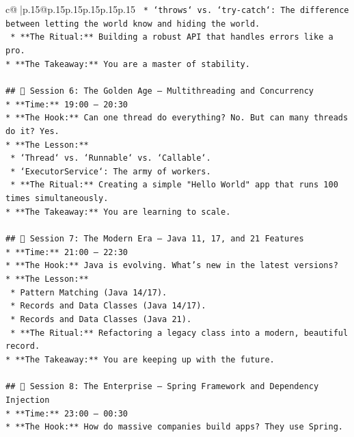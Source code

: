 \documentclass{article}
\begin{document}
{\begin{supertabular}{c@{$\;$}|p{.15\linewidth}@{}p{.15\linewidth}p{.15\linewidth}p{.15\linewidth}p{.15\linewidth}p{.15\linewidth}}
{{{\texttt{    *   `throws` vs. `try{-}catch`: The difference between letting the world know and hiding the world.} \\
\texttt{    *   **The Ritual:** Building a robust API that handles errors like a pro.} \\
\texttt{*   **The Takeaway:** You are a master of stability.} \\
\\ 
\texttt{\#\# 📅 Session 6: The Golden Age – Multithreading and Concurrency} \\
\texttt{*   **Time:** 19:00 – 20:30} \\
\texttt{*   **The Hook:** Can one thread do everything? No. But can many threads do it? Yes.} \\
\texttt{*   **The Lesson:**} \\
\texttt{    *   `Thread` vs. `Runnable` vs. `Callable`.} \\
\texttt{    *   `ExecutorService`: The army of workers.} \\
\texttt{    *   **The Ritual:** Creating a simple "Hello World" app that runs 100 times simultaneously.} \\
\texttt{*   **The Takeaway:** You are learning to scale.} \\
\\ 
\texttt{\#\# 📅 Session 7: The Modern Era – Java 11, 17, and 21 Features} \\
\texttt{*   **Time:** 21:00 – 22:30} \\
\texttt{*   **The Hook:** Java is evolving. What's new in the latest versions?} \\
\texttt{*   **The Lesson:**} \\
\texttt{    *   Pattern Matching (Java 14/17).} \\
\texttt{    *   Records and Data Classes (Java 14/17).} \\
\texttt{    *   Records and Data Classes (Java 21).} \\
\texttt{    *   **The Ritual:** Refactoring a legacy class into a modern, beautiful record.} \\
\texttt{*   **The Takeaway:** You are keeping up with the future.} \\
\\ 
\texttt{\#\# 📅 Session 8: The Enterprise – Spring Framework and Dependency Injection} \\
\texttt{*   **Time:** 23:00 – 00:30} \\
\texttt{*   **The Hook:** How do massive companies build apps? They use Spring.} \\
}}}
\end{supertabular}}
\end{document}
